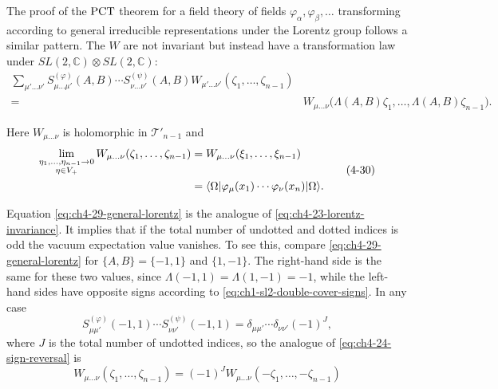 The proof of the $\mathrm{PCT}$ theorem for a field theory of fields
$\varphi_\alpha,\varphi_\beta,\ldots$ transforming according to general
irreducible representations under
the Lorentz group follows a similar pattern. The $W$ are not invariant but
instead have a transformation law under $SL(2,\mathbb C)\otimes
SL(2,\mathbb C)$:
\begin{equation}
\begin{aligned}
  \sum_{\mu'\ldots\nu'}
  S^{(\varphi)}_{\mu\ldots\mu'}(A,B)\cdots
  S^{(\psi)}_{\nu\ldots\nu'}(A,B)
  W_{\mu'\ldots\nu'}(\zeta_1,\ldots,\zeta_{n-1}) \\
  ={}&W_{\mu\ldots\nu}\bigl(\Lambda(A,B)\zeta_1,\ldots,
  \Lambda(A,B)\zeta_{n-1}\bigr).
\end{aligned}
\tag{4-29}\label{eq:ch4-29-general-lorentz}
\end{equation}

Here $W_{\mu\ldots\nu}$ is holomorphic in $\mathcal{T}'_{n-1}$ and
\begin{equation}
\begin{aligned}
  \lim_{\substack{\eta_1,\ldots,\eta_{n-1}\to0\\
                   \eta\in V_+}}
  W_{\mu\ldots\nu}(\zeta_1,\ldots,\zeta_{n-1})
  &=W_{\mu\ldots\nu}(\xi_1,\ldots,\xi_{n-1}) \\
  &=\langle \Omega\rvert\varphi_\mu(x_1)\cdots
    \varphi_\nu(x_n)\lvert \Omega\rangle.
\end{aligned}
\tag{4-30}\label{eq:ch4-30-general-boundary}
\end{equation}

Equation \eqref{eq:ch4-29-general-lorentz} is the analogue of \eqref{eq:ch4-23-lorentz-invariance}. It implies that if the total
number of undotted and dotted indices is odd the vacuum expectation value
vanishes. To see this, compare \eqref{eq:ch4-29-general-lorentz} for $\{A,B\}=\{-1,1\}$ and
$\{1,-1\}$. The right-hand side is the same for these two values, since
$\Lambda(-1,1)=\Lambda(1,-1)=-1$, while the left-hand sides have opposite
signs according to \eqref{eq:ch1-sl2-double-cover-signs}. In any case
\begin{equation}
  S^{(\varphi)}_{\mu\mu'}(-1,1)\cdots
  S^{(\psi)}_{\nu\nu'}(-1,1)
  =\delta_{\mu\mu'}\cdots\delta_{\nu\nu'}(-1)^J,
  \tag{4-31}\label{eq:ch4-31-general-sign}
\end{equation}
where $J$ is the total number of undotted indices, so the analogue of \eqref{eq:ch4-24-sign-reversal}
is
\begin{equation}
  W_{\mu\ldots\nu}(\zeta_1,\ldots,\zeta_{n-1})
  =(-1)^J W_{\mu\ldots\nu}(-\zeta_1,\ldots,-\zeta_{n-1})
  \tag{4-32}\label{eq:ch4-32-general-sign-reversal}
\end{equation}

